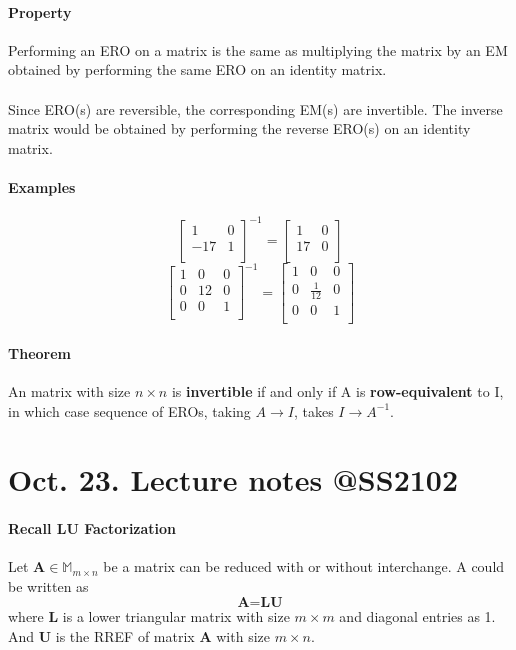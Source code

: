 \documentclass{article}
\begin{document}
	\paragraph{Property} Performing an ERO on a matrix is the same as multiplying the matrix by an EM obtained by performing the same ERO on an identity matrix.
	\paragraph{}Since ERO(s) are reversible, the corresponding EM(s) are invertible. The inverse matrix would be obtained by performing the reverse ERO(s) on an identity matrix.
	\paragraph{Examples}
	\[
	\begin{bmatrix}
		1 & 0 \\
		-17 & 1 \\
	\end{bmatrix}^{-1} = 
	\begin{bmatrix}
		1 & 0 \\
		17 & 0 \\
	\end{bmatrix}
	\]
	\[
	\begin{bmatrix}
		1 & 0 & 0 \\
		0 & 12 & 0 \\
		0 & 0 & 1 \\
	\end{bmatrix}^{-1} = 
	\begin{bmatrix}
		1 & 0 & 0 \\
		0 & \frac{1}{12} & 0 \\
		0 & 0 & 1 \\
	\end{bmatrix}
	\]
	\paragraph{Theorem} An matrix with size $n \times n$ is \textbf{invertible} if and only if A is \textbf{row-equivalent} to I, in which case sequence of EROs, taking $A \rightarrow I$, takes $I \rightarrow A^{-1}$.
	\section{Oct. 23. Lecture notes @SS2102}
	\paragraph{Recall LU Factorization} Let $\textbf{A} \in \mathbb{M}_{m \times n}$ be a matrix can be reduced with or without interchange. A could be written as
	\[
	\textbf{A} = \textbf{L} \textbf{U}
	\]
	where \textbf{L} is a lower triangular matrix with size $m \times m$ and diagonal entries as 1. And \textbf{U} is the RREF of matrix \textbf{A} with size $m \times n$.
\end{document}
